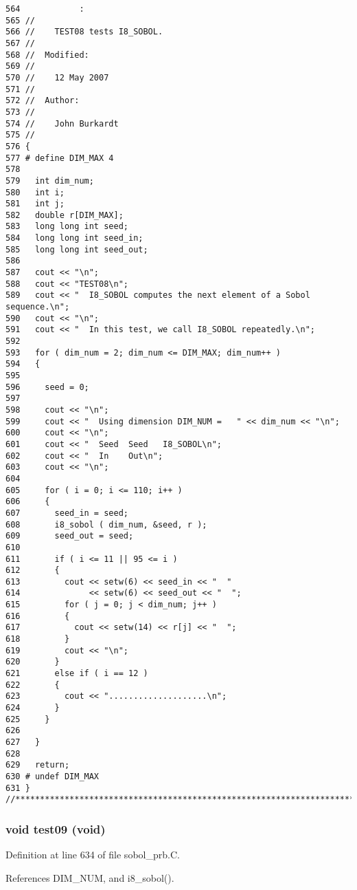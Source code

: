 \begin{Code}\begin{verbatim}564            :
565 //
566 //    TEST08 tests I8_SOBOL.
567 //
568 //  Modified:
569 //
570 //    12 May 2007
571 //
572 //  Author:
573 //
574 //    John Burkardt
575 //
576 {
577 # define DIM_MAX 4
578 
579   int dim_num;
580   int i;
581   int j;
582   double r[DIM_MAX];
583   long long int seed;
584   long long int seed_in;
585   long long int seed_out;
586 
587   cout << "\n";
588   cout << "TEST08\n";
589   cout << "  I8_SOBOL computes the next element of a Sobol sequence.\n";
590   cout << "\n";
591   cout << "  In this test, we call I8_SOBOL repeatedly.\n";
592 
593   for ( dim_num = 2; dim_num <= DIM_MAX; dim_num++ )
594   {
595 
596     seed = 0;
597 
598     cout << "\n";
599     cout << "  Using dimension DIM_NUM =   " << dim_num << "\n";
600     cout << "\n";
601     cout << "  Seed  Seed   I8_SOBOL\n";
602     cout << "  In    Out\n";
603     cout << "\n";
604 
605     for ( i = 0; i <= 110; i++ )
606     {
607       seed_in = seed;
608       i8_sobol ( dim_num, &seed, r );
609       seed_out = seed;
610 
611       if ( i <= 11 || 95 <= i )
612       {
613         cout << setw(6) << seed_in << "  "
614              << setw(6) << seed_out << "  ";
615         for ( j = 0; j < dim_num; j++ )
616         {
617           cout << setw(14) << r[j] << "  ";
618         }
619         cout << "\n";
620       }
621       else if ( i == 12 )
622       {
623         cout << "....................\n";
624       }
625     }
626 
627   }
628 
629   return;
630 # undef DIM_MAX
631 }
//****************************************************************************80
\end{verbatim}
\end{Code}


\subsubsection{\setlength{\rightskip}{0pt plus 5cm}void test09 (void)}\label{sobol__prb_8C_0cb5ceb9c965f16407f20b72abff57a9}




Definition at line 634 of file sobol\_\-prb.C.

References DIM\_\-NUM, and i8\_\-sobol().

